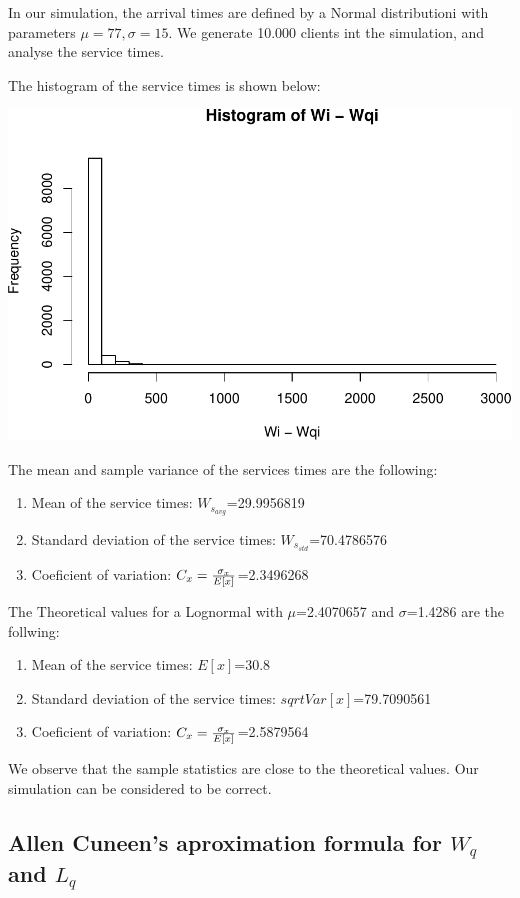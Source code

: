 \documentclass[]{article}
\providecommand{\tightlist}{%
  \setlength{\itemsep}{0pt}\setlength{\parskip}{0pt}}
\begin{document}
In our simulation, the arrival times are defined by a Normal
distributioni with parameters \(\mu=77, \sigma=15\). We generate 10.000
clients int the simulation, and analyse the service times.

The histogram of the service times is shown below:

\begin{center}\includegraphics[width=0.5\linewidth]{003_files/figure-latex/unnamed-chunk-7-1} \end{center}

The mean and sample variance of the services times are the following:

\begin{enumerate}
\def\labelenumi{\arabic{enumi}.}
\tightlist
\item
  Mean of the service times: \(W_{s_{avg}}\)=29.9956819
\item
  Standard deviation of the service times: \(W_{s_{std}}\)=70.4786576
\item
  Coeficient of variation: \(C_{x}={ \sigma_{x} \over E[x] }\)=2.3496268
\end{enumerate}

The Theoretical values for a Lognormal with \(\mu\)=2.4070657 and
\(\sigma\)=1.4286 are the follwing:

\begin{enumerate}
\def\labelenumi{\arabic{enumi}.}
\tightlist
\item
  Mean of the service times: \(E[x]\)=30.8
\item
  Standard deviation of the service times: \(sqrt{Var[x]}\)=79.7090561
\item
  Coeficient of variation: \(C_{x}={ \sigma_{x} \over E[x] }\)=2.5879564
\end{enumerate}

We observe that the sample statistics are close to the theoretical
values. Our simulation can be considered to be correct.

\subsection{\texorpdfstring{Allen Cuneen's aproximation formula for
\(W_{q}\) and
\(L_{q}\)}{Allen Cuneen's aproximation formula for W\_\{q\} and L\_\{q\}}}\label{allen-cuneens-aproximation-formula-for-w_q-and-l_q}
\end{document}
